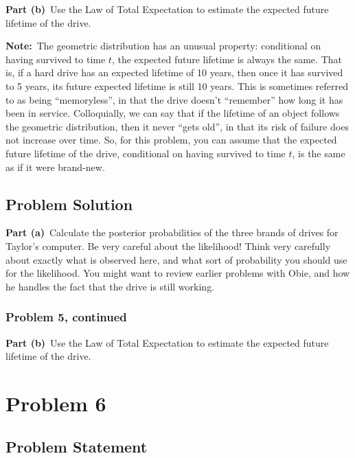 \documentclass[12pt]{article}
\theoremstyle{definition}
\begin{document}
\bigskip
\noindent
{\bf Part (b)}\ Use the Law of Total Expectation to estimate the expected future lifetime of the drive.

\bigskip
\noindent
{\bf Note:}\ The geometric distribution has an unusual property: conditional on having survived to time $t$, the expected future lifetime is always the same. That is, if a hard drive has an expected lifetime of 10 years, then once it has survived to 5 years, its future expected lifetime is still 10 years. This is sometimes referred to as being ``memoryless'', in that the drive doesn't ``remember'' how long it has been in service. Colloquially, we can say that if the lifetime of an object follows the geometric distribution, then it never ``gets old'', in that its risk of failure does not increase over time. So, for this problem, you can assume that the expected future lifetime of the drive, conditional on having survived to time $t$, is the same as if it were brand-new.


\newpage
\subsection*{Problem Solution}

\noindent
{\bf Part (a)}\ Calculate the posterior probabilities of the three brands of drives for Taylor's computer. Be very careful about the likelihood! Think very carefully about exactly what is observed here, and what sort of probability you should use for the likelihood. You might want to review earlier problems with Obie, and how he handles the fact that the drive is still working.

\newpage
\subsubsection*{Problem 5, continued}

\noindent
{\bf Part (b)}\ Use the Law of Total Expectation to estimate the expected future lifetime of the drive.


\newpage
\section*{Problem 6}


\subsection*{Problem Statement}
\end{document}
